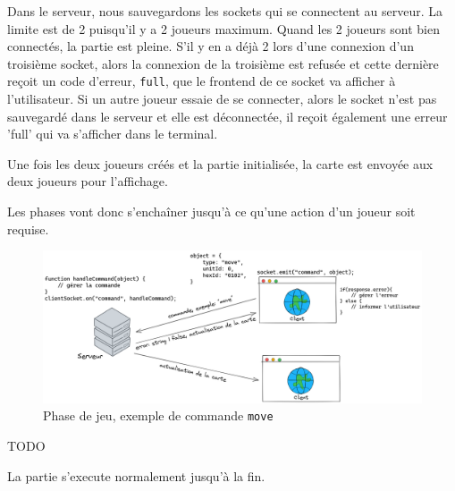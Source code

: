 Dans le serveur, nous sauvegardons les sockets qui se connectent au serveur. La limite est de 2 puisqu'il y a 2 joueurs maximum. Quand les 2 joueurs sont bien connectés, la partie est pleine. S'il y en a déjà 2 lors d'une connexion d'un troisième socket, alors la connexion de la troisième est refusée et cette dernière reçoit un code d'erreur, {\tt full}, que le frontend de ce socket va afficher à l'utilisateur.
Si un autre joueur essaie de se connecter, alors le socket n'est pas sauvegardé dans le serveur et elle est déconnectée, il reçoit également une erreur 'full' qui va s'afficher dans le terminal.

Une fois les deux joueurs créés et la partie initialisée, la carte est envoyée aux deux joueurs pour l'affichage.

Les phases vont donc s'enchaîner jusqu'à ce qu'une action d'un joueur soit requise.

\begin{figure}[H]
    \centering
    \includegraphics[scale=0.25]{data/reseau_commande.png}
    \caption{Phase de jeu, exemple de commande {\tt move}}
\end{figure}

TODO

La partie s'execute normalement jusqu'à la fin.